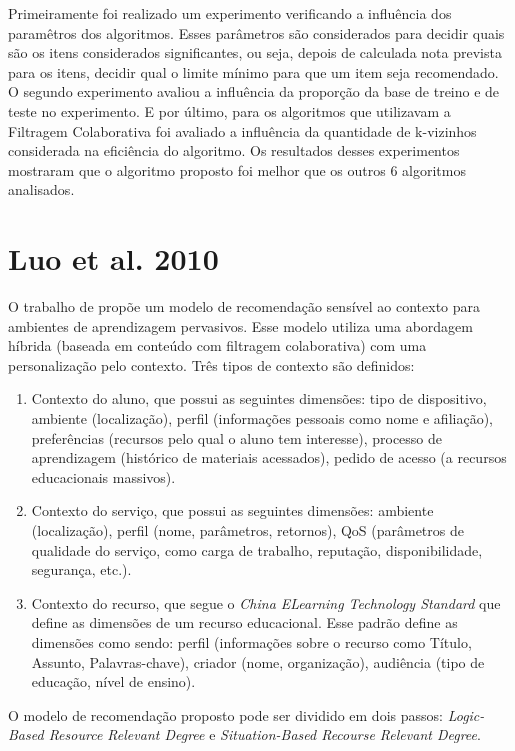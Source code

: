 Primeiramente foi realizado um experimento verificando a influência dos paramêtros dos algoritmos. Esses parâmetros são
considerados para decidir quais são os itens considerados significantes, ou seja, depois de calculada nota prevista para
os itens, decidir qual o limite mínimo para que um item seja recomendado. O segundo experimento avaliou a influência da
proporção da base de treino e de teste no experimento. E por último, para os algoritmos que utilizavam a Filtragem
Colaborativa foi avaliado a influência da quantidade de k-vizinhos considerada na eficiência do algoritmo. Os resultados
desses experimentos mostraram que o algoritmo proposto foi melhor que os outros 6 algoritmos analisados.

\section{Luo et al. 2010}

O trabalho de  propõe um modelo de recomendação sensível ao contexto para ambientes de
aprendizagem pervasivos. Esse modelo utiliza uma abordagem híbrida (baseada em conteúdo com filtragem colaborativa)
com uma personalização pelo contexto. Três tipos de contexto são definidos:

\begin{enumerate}
\item Contexto do aluno, que possui as seguintes dimensões: tipo de dispositivo, ambiente (localização), perfil
(informações pessoais como nome e afiliação), preferências (recursos pelo qual o aluno tem interesse), processo de
aprendizagem (histórico de materiais acessados), pedido de acesso (a recursos educacionais massivos).
\item Contexto do serviço, que possui as seguintes dimensões: ambiente (localização), perfil (nome, parâmetros,
retornos), QoS (parâmetros de qualidade do serviço, como carga de trabalho, reputação, disponibilidade, segurança, etc.).
\item Contexto do recurso, que segue o \textit{China ELearning Technology Standard} que define as dimensões de um recurso
educacional. Esse padrão define as dimensões como sendo: perfil (informações sobre o recurso como Título, Assunto,
Palavras-chave), criador (nome, organização), audiência (tipo de educação, nível de ensino).
\end{enumerate}

O modelo de recomendação proposto pode ser dividido em dois passos: \textit{Logic-Based Resource Relevant Degree} e
\textit{Situation-Based Recourse Relevant Degree}.

